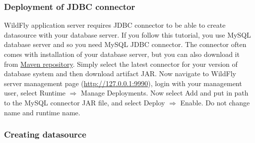 \documentclass[12pt,a4paper]{article}
\begin{document}
\subsubsection{Deployment of JDBC connector}
WildFly application server requires JDBC connector to be able to create datasource with your database server. If you follow this tutorial, you use MySQL database server and so you need MySQL JDBC connector. The connector often comes with installation of your database server, but you can also download it from \href{http://mvnrepository.com/artifact/mysql/mysql-connector-java/5.1.33}{Maven repository}. Simply select the latest connector for your version of database system and then download artifact JAR. 
Now navigate to WildFly server management page (\url{http://127.0.0.1:9990}), login with your management user, select Runtime $\Rightarrow$ Manage Deployments. Now select Add and put in path to the MySQL connector JAR file, and select Deploy $\Rightarrow$ Enable. Do not change name and runtime name.

\subsubsection{Creating datasource}
\end{document}
